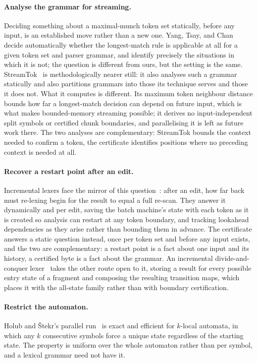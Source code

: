 \documentclass[11pt,a4paper]{article}
\theoremstyle{definition}
\theoremstyle{plain}
\begin{document}
\paragraph{Analyse the grammar for streaming.} Deciding something about a maximal-munch token set statically, before
any input, is an established move rather than a new one. Yang, Tsay, and Chan~\cite{yang2002longest} decide
automatically whether the longest-match rule is applicable at all for a given token set and parser grammar, and
identify precisely the situations in which it is not; the question is different from ours, but the setting is the
same. StreamTok~\cite{li2026streaming} is methodologically nearer still: it also analyses such a grammar statically
and also partitions grammars into those its technique serves and those it does not. What it computes is different. Its
maximum token neighbour distance bounds how far a longest-match decision can depend on future input, which is what
makes bounded-memory streaming possible; it derives no input-independent split symbols or certified chunk boundaries,
and parallelising it is left as future work there. The two analyses are complementary: StreamTok bounds the context
needed to confirm a token, the certificate identifies positions where no preceding context is needed at all.

\paragraph{Recover a restart point after an edit.} Incremental lexers face the mirror of this
question~\cite{wagner1997lexing}: after an edit, how far back must re-lexing begin for the result to equal a full
re-scan. They answer it dynamically and per edit, saving the batch machine's state with each token as it is created so
analysis can restart at any token boundary, and tracking lookahead dependencies as they arise rather than bounding
them in advance. The certificate answers a static question instead, once per token set and before any input exists,
and the two are complementary: a restart point is a fact about one input and its history, a certified byte is a fact
about the grammar. An incremental divide-and-conquer lexer~\cite{hugo2015incremental} takes the other route open to
it, storing a result for every possible entry state of a fragment and composing the resulting transition maps, which
places it with the all-state family rather than with boundary certification.

\paragraph{Restrict the automaton.} Holub and \v{S}tekr's parallel run~\cite{holub2009parallel} is exact and
efficient for $k$-local automata, in which any $k$ consecutive symbols force a unique state regardless of the starting
state. The property is uniform over the whole automaton rather than per symbol, and a lexical grammar need not have
it.
\end{document}
